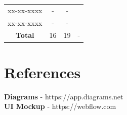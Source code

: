 \documentclass[12pt, a4paper]{report}
\begin{document}
\begin{table}[H]
\begin{tabular}{cccc}
            xx-xx-xxxx      & -                         & -                             &                                               \\
            xx-xx-xxxx      & -                         & -                             &                                               \\ \hline
            \textbf{Total}  & 16                        & 19                            & -                                             \\  
        \end{tabular}
    \end{table}


\chapter{References}

    \textbf{Diagrams} - https://app.diagrams.net
    \\
    \textbf{UI Mockup} - https://webflow.com
\end{document}
